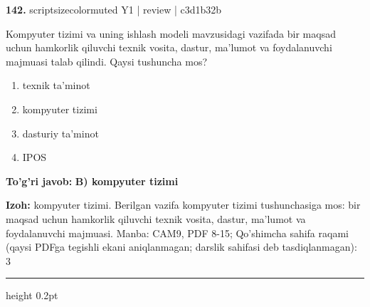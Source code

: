 \documentclass[10pt,a4paper]{article}
\begin{document}
{\bfseries\sffamily\color{ink} 142.} {scriptsizecolor{muted} Y1 | review | c3d1b32b}
\par
Kompyuter tizimi va uning ishlash modeli mavzusidagi vazifada bir maqsad uchun hamkorlik qiluvchi texnik vosita, dastur, ma'lumot va foydalanuvchi majmuasi talab qilindi. Qaysi tushuncha mos?
\begin{enumerate}[label=\Alph*),leftmargin=9mm]
\item texnik ta'minot
\item kompyuter tizimi
\item dasturiy ta'minot
\item IPOS
\end{enumerate}
\begin{tcolorbox}[enhanced,breakable,colback=teal!4,colframe=teal!60!black,boxrule=0.45pt,arc=1.2mm,left=2.7mm,right=2.7mm,top=1.8mm,bottom=1.8mm,before skip=2mm,after skip=2mm]
{\bfseries\sffamily\color{teal}To'g'ri javob:} \textbf{B) kompyuter tizimi}
\par\smallskip
{\bfseries Izoh:} kompyuter tizimi. Berilgan vazifa kompyuter tizimi tushunchasiga mos: bir maqsad uchun hamkorlik qiluvchi texnik vosita, dastur, ma'lumot va foydalanuvchi majmuasi. Manba: CAM9, PDF 8-15; Qo'shimcha sahifa raqami (qaysi PDFga tegishli ekani aniqlanmagan; darslik sahifasi deb tasdiqlanmagan): 3
\end{tcolorbox}
\vspace{2mm}\hrule height 0.2pt\vspace{3mm}
\end{document}
